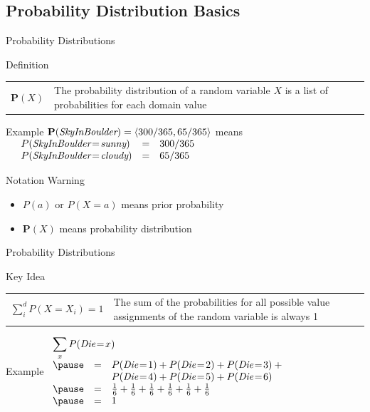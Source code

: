 \documentclass[12pt]{beamer}
\newcommand{\EM}[1]{\mbox{\em#1}}
\begin{document}
\subsection{Probability Distribution Basics}
\begin{frame}{Probability Distributions}
	\begin{block}{Definition}
		\begin{tabular}{lm{3.5in}@{}}
			\large $\mathbf{P}(X)$
			&
			The \alert{probability distribution} of a random variable $X$ is a list of probabilities for each domain value
		\end{tabular}
	\end{block}
	\pause
	\begin{block}{Example}
		$\mathbf{P}(\EM{SkyInBoulder}) = \langle 300/365, 65/365 \rangle$ means \\[.25em]
		$
		\begin{array}{llll}
			& P(\EM{SkyInBoulder}\!=\!\EM{sunny})  & = & 300/365 \\
			& P(\EM{SkyInBoulder}\!=\!\EM{cloudy}) & = & 65/365 \\
		\end{array}
		$
	\end{block}
	\pause
	\begin{block}{Notation Warning}
		\begin{itemize}
			\item $P(a)$ or $P(X\!=\!a)$ means prior probability
			\item $\mathbf{P}(X)$ means probability distribution
		\end{itemize}
	\end{block}
\end{frame}
\begin{frame}{Probability Distributions}
	\begin{block}{Key Idea}
		\begin{tabular}{lm{2.4in}@{}}
			\large $\sum\limits^{d}_{i}{P(X=X_{i})} = 1$
			&
			The sum of the probabilities for all possible value assignments of the random variable is always 1
		\end{tabular}
	\end{block}
	\pause
	\begin{block}{Example}
		$
		\begin{array}{lll}
			\lefteqn{\sum\limits_{x}{P(\EM{Die}\!=\!x)}} \\
			\pause
			& = & P(\EM{Die}\!=\!1) + P(\EM{Die}\!=\!2) + P(\EM{Die}\!=\!3) + \mbox{}\\
			&   & P(\EM{Die}\!=\!4) + P(\EM{Die}\!=\!5) + P(\EM{Die}\!=\!6) \\
			\pause
			& = & \frac{1}{6} + \frac{1}{6} + \frac{1}{6} + \frac{1}{6} + \frac{1}{6} + \frac{1}{6} \\
			\pause
			& = & 1
		\end{array}
		$
	\end{block}
\end{frame}
\end{document}
